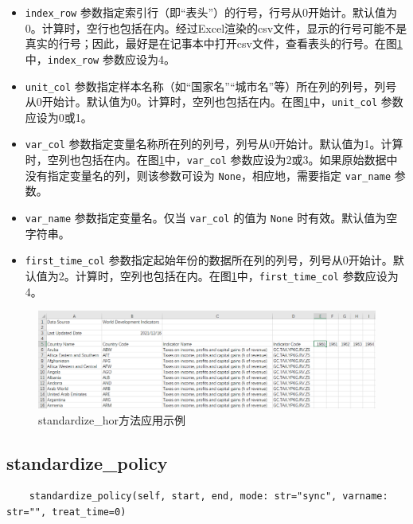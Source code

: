 \documentclass[a4paper, UTF8, fontset=none]{ctexart}
\begin{document}
    \begin{itemize}
        \item \verb|index_row| 参数指定索引行（即“表头”）的行号，行号从0开始计。默认值为0。计算时，空行也包括在内。经过Excel渲染的csv文件，显示的行号可能不是真实的行号；因此，最好是在记事本中打开csv文件，查看表头的行号。在图\ref{standardize_hor}中，\verb|index_row| 参数应设为4。
        \item \verb|unit_col| 参数指定样本名称（如“国家名”“城市名”等）所在列的列号，列号从0开始计。默认值为0。计算时，空列也包括在内。在图\ref{standardize_hor}中，\verb|unit_col| 参数应设为0或1。
        \item \verb|var_col| 参数指定变量名称所在列的列号，列号从0开始计。默认值为1。计算时，空列也包括在内。在图\ref{standardize_hor}中，\verb|var_col| 参数应设为2或3。如果原始数据中没有指定变量名的列，则该参数可设为 \verb|None|，相应地，需要指定 \verb|var_name| 参数。
        \item \verb|var_name| 参数指定变量名。仅当 \verb|var_col| 的值为 \verb|None| 时有效。默认值为空字符串。
        \item \verb|first_time_col| 参数指定起始年份的数据所在列的列号，列号从0开始计。默认值为2。计算时，空列也包括在内。在图\ref{standardize_hor}中，\verb|first_time_col| 参数应设为4。
    \end{itemize}

    \begin{figure}
        \centering
        \includegraphics[width=\textwidth]{pics/001.png}
        \caption{standardize\_hor方法应用示例}
        \label{standardize_hor}
    \end{figure}

\subsection{standardize\_policy}

    \begin{lstlisting}
    standardize_policy(self, start, end, mode: str="sync", varname: str="", treat_time=0)
    \end{lstlisting}    
\end{document}
